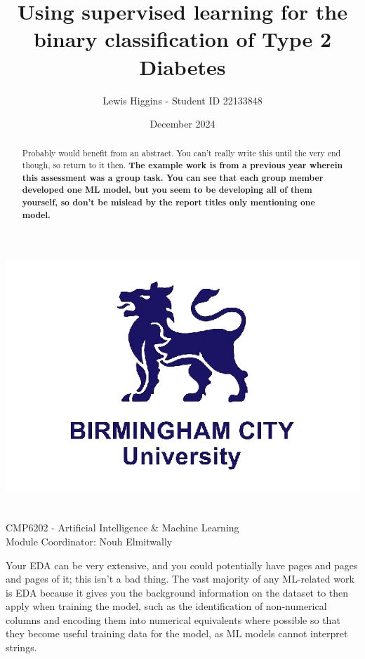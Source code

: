 \documentclass[12pt]{report}
\title{Using supervised learning for the binary classification of Type 2 Diabetes}
\author{Lewis Higgins - Student ID 22133848}
\date{December 2024}
\begin{document}
\makeatletter
\begin{titlepage}
    \begin{center}
        \includegraphics[width=0.7\linewidth]{BCU}\\[4ex]
        {\huge \bfseries  \@title}\\[50ex]
        {\@author}\\[2ex]
        {CMP6202 - Artificial Intelligence \& Machine Learning}\\[2ex]
        {Module Coordinator: Nouh Elmitwally}\\[10ex]
    \end{center}
\end{titlepage}
\makeatother
\thispagestyle{empty}
\newpage


\setcounter{page}{0}


\tableofcontents
\thispagestyle{empty}

\pagecolor{yellow}
\begin{abstract}
    Probably would benefit from an abstract. You can't really write this until the very end though,
    so return to it then. \textbf{The example work is from a previous year wherein this assessment was a group task.
    You can see that each group member developed one ML model, but you seem to be developing all of them yourself, so don't be mislead
    by the report titles only mentioning one model.}
\end{abstract}
\pagecolor{white}



Your EDA can be very extensive, and you could potentially have pages and pages and pages of it; this isn't a bad thing.
The vast majority of any ML-related work is EDA because it gives you the background information on the dataset to then apply
when training the model, such as the identification of non-numerical columns and encoding them into numerical equivalents where
possible so that they become useful training data for the model, as ML models cannot interpret strings.
\end{document}
